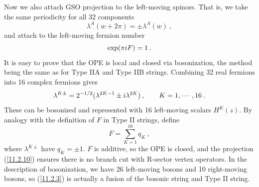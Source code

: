 Now we also attach GSO projection to the left-moving spinors. That is, we take the same periodicity for all 32 components
\begin{equation}
	\lambda^{A}(w+2\pi)=\pm\lambda^{A}(w)  \:, \label{11.2.9}
\end{equation}
and attach to the left-moving fermion number
\begin{equation}
	\exp(\pi i F)=1\:. \label{11.2.10}
\end{equation}
It is easy to prove that the OPE is local and closed via bosonization, the method being the same as for Type IIA and Type IIB strings. Combining 32 real fermions into 16 complex fermions gives
\begin{equation}
	\lambda^{K\pm}=2^{-1/2}(\lambda^{2K-1}\pm i\lambda^{2K})\:, \qquad K=1,\cdots,16 \:. \label{11.2.11}
\end{equation}
These can be bosonized and represented with 16 left-moving scalars $H^{K}(z)$. By analogy with the definition of $F$ in Type II strings, define
\begin{equation}
	F=\sum_{K=1}^{16}q_{K} \:, \label{11.2.12}
\end{equation}
where $\lambda^{K\pm}$ have $q_{K}=\pm1$. $F$ is additive, so the OPE is closed, and the projection (\ref{11.2.10}) ensures there is no branch cut with R-sector vertex operators. In the description of bosonization, we have 26 left-moving bosons and 10 right-moving bosons, so (\ref{11.2.3}) is actually a fusion of the bosonic string and Type II string.

